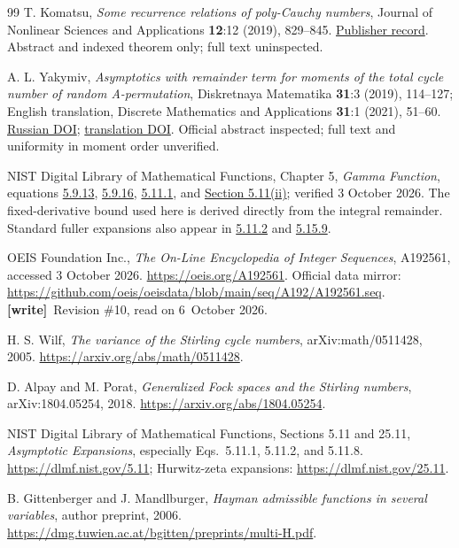 \documentclass[11pt,letterpaper]{article}
\numberwithin{equation}{section}
\theoremstyle{definition}\newtheorem{definition}[theorem]{Definition}
\theoremstyle{remark}\newtheorem{remark}[theorem]{Remark}
\newcommand{\wtag}{\textup{\textbf{[write]}}}
\begin{document}
\begin{thebibliography}{99}
T. Komatsu, \emph{Some recurrence relations of poly-Cauchy numbers},
Journal of Nonlinear Sciences and Applications \textbf{12}:12
(2019), 829--845.
\href{https://www.isr-publications.com/jnsa/articles-8077-some-recurrence-relations-of-poly-cauchy-numbers}
{Publisher record}. Abstract and indexed theorem only; full text
uninspected.

A. L. Yakymiv, \emph{Asymptotics with remainder term for moments
of the total cycle number of random A-permutation},
Diskretnaya Matematika \textbf{31}:3 (2019), 114--127;
English translation, Discrete Mathematics and Applications
\textbf{31}:1 (2021), 51--60.
\href{https://doi.org/10.4213/dm1582}{Russian DOI};
\href{https://doi.org/10.1515/dma-2021-0005}{translation DOI}.
Official abstract inspected; full text and uniformity in moment order
unverified.

NIST Digital Library of Mathematical Functions, Chapter 5,
\emph{Gamma Function}, equations
\href{https://dlmf.nist.gov/5.9.E13}{5.9.13},
\href{https://dlmf.nist.gov/5.9.E16}{5.9.16},
\href{https://dlmf.nist.gov/5.11.E1}{5.11.1}, and
\href{https://dlmf.nist.gov/5.11.ii}{Section 5.11(ii)};
verified 3 October 2026. The fixed-derivative bound used here is
derived directly from the integral remainder. Standard fuller
expansions also appear in
\href{https://dlmf.nist.gov/5.11.E2}{5.11.2} and
\href{https://dlmf.nist.gov/5.15.E9}{5.15.9}.

OEIS Foundation Inc., \emph{The On-Line Encyclopedia of Integer
Sequences}, A192561, accessed 3 October 2026.
\url{https://oeis.org/A192561}.
Official data mirror:
\url{https://github.com/oeis/oeisdata/blob/main/seq/A192/A192561.seq}.
\wtag\ Revision \#10, read on 6~October 2026.

H. S. Wilf, \emph{The variance of the Stirling cycle numbers},
arXiv:math/0511428, 2005.
\url{https://arxiv.org/abs/math/0511428}.

D. Alpay and M. Porat, \emph{Generalized Fock spaces and the
Stirling numbers}, arXiv:1804.05254, 2018.
\url{https://arxiv.org/abs/1804.05254}.

NIST Digital Library of Mathematical Functions,
Sections 5.11 and 25.11, \emph{Asymptotic Expansions}, especially
Eqs.~5.11.1, 5.11.2, and 5.11.8.
\url{https://dlmf.nist.gov/5.11}; Hurwitz-zeta expansions:
\url{https://dlmf.nist.gov/25.11}.

B. Gittenberger and J. Mandlburger,
\emph{Hayman admissible functions in several variables},
author preprint, 2006.
\url{https://dmg.tuwien.ac.at/bgitten/preprints/multi-H.pdf}.


\end{thebibliography}
\end{document}
